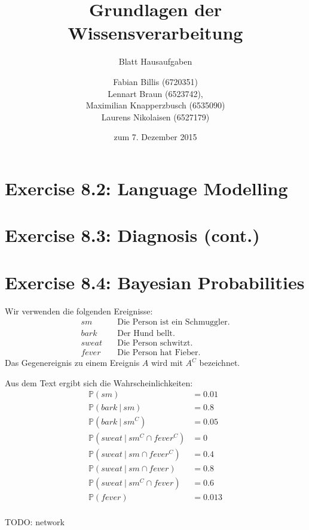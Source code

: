\documentclass[a4paper]{scrartcl}
\title{Grundlagen der Wissensverarbeitung}
\subtitle{Blatt {\blattnr} Hausaufgaben}
\author{
    Fabian Billis (6720351) \\
    Lennart Braun (6523742), \\
    Maximilian Knapperzbusch (6535090) \\
    Laurens Nikolaisen (6527179) \\
}
\date{zum 7. Dezember 2015}
\newcommand{\prob}{\mathbb{P}}
\def \blattnr {8}
\begin{document}
\maketitle

\section*{Exercise \blattnr.2: Language Modelling}

\section*{Exercise \blattnr.3: Diagnosis (cont.)}

\section*{Exercise \blattnr.4: Bayesian Probabilities}

Wir verwenden die folgenden Ereignisse:
\begin{align*}
    sm &\quad \text{Die Person ist ein Schmuggler.} \\
    bark &\quad \text{Der Hund bellt.} \\
    sweat &\quad \text{Die Person schwitzt.} \\
    fever &\quad \text{Die Person hat Fieber.}
\end{align*}
Das Gegenereignis zu einem Ereignis $A$ wird mit $A^C$ bezeichnet.

Aus dem Text ergibt sich die Wahrscheinlichkeiten:
\begin{align*}
    \prob(sm) &= \num{0,01} \\
    \prob(bark\ |\ sm) &= \num{0,8} \\
    \prob(bark\ |\ sm^C) &= \num{0,05} \\
    \prob(sweat\ |\ sm^C \cap fever^C) &= \num{0} \\
    \prob(sweat\ |\ sm \cap fever^C) &= \num{0.4} \\
    \prob(sweat\ |\ sm \cap fever) &= \num{0.8} \\
    \prob(sweat\ |\ sm^C \cap fever) &= \num{0.6} \\
    \prob(fever) &= \num{0,013} \\
\end{align*}

TODO: network
\end{document}
